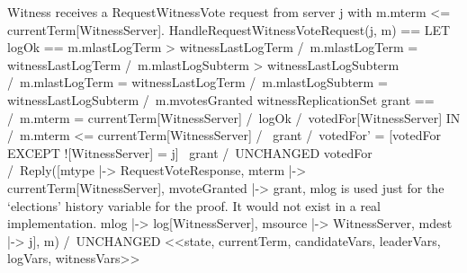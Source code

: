 \documentclass[preview, border={5pt 0pt 5pt 1pt}]{standalone}
\begin{document}
\onehalfspacing

    \begin{tla}

\* Witness receives a RequestWitnessVote request from server j with
\* m.mterm <= currentTerm[WitnessServer].
HandleRequestWitnessVoteRequest(j, m) ==
    LET logOk == \/ m.mlastLogTerm > witnessLastLogTerm
                 \/ /\ m.mlastLogTerm = witnessLastLogTerm
                    /\ m.mlastLogSubterm > witnessLastLogSubterm
                 \/ /\ m.mlastLogTerm = witnessLastLogTerm
                    /\ m.mlastLogSubterm = witnessLastLogSubterm
                    /\ m.mvotesGranted \subseteq witnessReplicationSet
        grant == /\ m.mterm = currentTerm[WitnessServer]
                 /\ logOk
                 /\ votedFor[WitnessServer] 
    IN /\ m.mterm <= currentTerm[WitnessServer]
       /\ \/ grant  /\ votedFor' = [votedFor EXCEPT ![WitnessServer] = j]
          \/ ~grant /\ UNCHANGED votedFor
       /\ Reply([mtype        |-> RequestVoteResponse,
                 mterm        |-> currentTerm[WitnessServer],
                 mvoteGranted |-> grant,
                 \* mlog is used just for the `elections' history variable for
                 \* the proof. It would not exist in a real implementation.
                 mlog         |-> log[WitnessServer],
                 msource      |-> WitnessServer,
                 mdest        |-> j],
                 m)
       /\ UNCHANGED <<state, currentTerm, candidateVars, leaderVars, 
                      logVars, witnessVars>>

    \end{tla}
\end{document}
